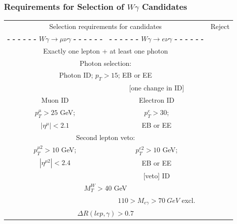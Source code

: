 \begin{frame}\frametitle{Requirements for Selection of $W\gamma$ Candidates}
  \begin{table}[h]
     \tiny
     \begin{center}
     \begin{tabular}{|c|c|c|}
     \hline
     \multicolumn{2}{|c|}{Selection requirements for candidates} & Reject \\ 
     {\bfseries{- - - - - - $W\gamma\rightarrow\mu\nu\gamma$ - - - - - -}} & 
     {\bfseries{- - - - - - $W\gamma\rightarrow e\nu\gamma$ - - - - - -}}  & \\ \hline
     \multicolumn{2}{|c|}{Exactly one lepton + at least one photon}  & \\ \hline
     \multicolumn{2}{|c|}{Photon selection:} & \\
     \multicolumn{2}{|c|}{\tiny{Photon ID; $p_T>15$; EB or EE}} & \\ 
                                                               &{\tiny{ [one change in ID]}} & \\ \hline
      Muon ID & Electron ID & \\ \hline
      \tiny{$p_T^{\mu}>25$ GeV;} &  \tiny{$p_T^{e}>30$;}  & \\ 
      \tiny{$|\eta^{\mu}|<2.1$} & \tiny{ EB or EE} & \\ \hline
      \multicolumn{2}{|c|}{Second lepton veto:} & \\
      \tiny{$p_T^{\mu2}>10$ GeV;} &  \tiny{$p_T^{e2}>10$ GeV;} & \\
      \tiny{$|\eta^{\mu2}|<2.4$}  &   \tiny{ EB or EE} & \\
                                &   \tiny{[veto] ID} & \\ \hline
      \multicolumn{2}{|c|}{$M_T^W>$40 GeV} & \\ \hline
                                & $110>M_{e\gamma}>70~GeV$ excl. & \\ \hline
      \multicolumn{2}{|c|}{$\Delta{R}(lep,\gamma)>0.7$} & \\  \hline
      \end{tabular}
      \end{center}
  \end{table}
\end{frame}%

